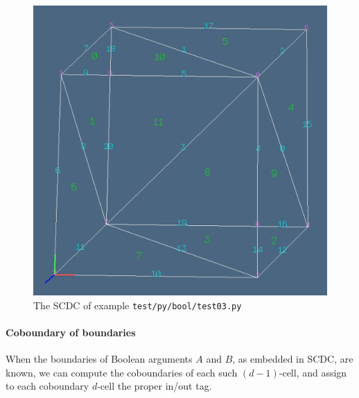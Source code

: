 \documentclass[11pt,oneside]{article}	%
\begin{document}
\begin{figure}[htbp] %
   \centering
   \includegraphics[width=0.5\linewidth]{images/boundaryfacets} 
   \caption{The SCDC of example \texttt{test/py/bool/test03.py}}
   \label{fig:test03}
\end{figure}


\paragraph{Coboundary of boundaries}
When the boundaries of Boolean arguments $A$ and $B$, as embedded in SCDC, are known, we can compute the coboundaries of each such $(d-1)$-cell, and assign to each coboundary $d$-cell the proper in/out tag.
\end{document}
